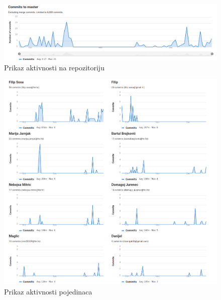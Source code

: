 		\begin{figure}[H]
			\includegraphics[scale=0.35]{slike/gitlab2.png}
			\centering
			\caption{Prikaz aktivnosti na repozitoriju}
			\label{fig:promjene}
		\end{figure}
		\begin{figure}[H]
			\includegraphics[scale=0.4]{slike/gitlab1.png}
			\centering
			\caption{Prikaz aktivnosti pojedinaca}
			\label{fig:promjene}
		\end{figure}
		
		\eject
		
	